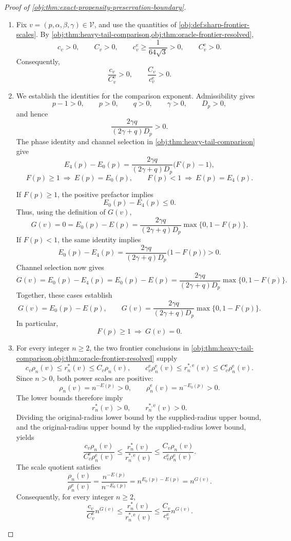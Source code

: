 \documentclass[11pt]{article}
\begin{document}
\begin{proof}[Proof of \cref{obj:thm:exact-propensity-preservation-boundary}]
\begin{enumerate}
\item Fix \(v=(p,\alpha,\beta,\gamma)\in\mathcal V\), and use the quantities of \cref{obj:def:sharp-frontier-scales}. By \cref{obj:thm:heavy-tail-comparison,obj:thm:oracle-frontier-resolved},
\[
c_v>0,\qquad C_v>0,\qquad
c^{\mathrm e}_v\ge\frac{1}{64\sqrt3}>0,\qquad
C^{\mathrm e}_v>0.
\]
Consequently,
\[
\frac{c_v}{C^{\mathrm e}_v}>0,
\qquad
\frac{C_v}{c^{\mathrm e}_v}>0.
\]

\item We establish the identities for the comparison exponent. Admissibility gives
\[
p-1>0,\qquad p>0,\qquad q>0,\qquad
\gamma>0,\qquad D_p>0,
\]
and hence
\[
\frac{2\gamma q}{(2\gamma+q)D_p}>0.
\]
The phase identity and channel selection in \cref{obj:thm:heavy-tail-comparison} give
\[
E_4(p)-E_0(p)
=
\frac{2\gamma q}{(2\gamma+q)D_p}\bigl(F(p)-1\bigr),
\]
\[
F(p)\ge1\ \Longrightarrow\ E(p)=E_0(p),
\qquad
F(p)<1\ \Longrightarrow\ E(p)=E_4(p).
\]

If \(F(p)\ge1\), the positive prefactor implies
\[
E_0(p)-E_4(p)\le0.
\]
Thus, using the definition of \(G(v)\),
\[
G(v)=0=E_0(p)-E(p)
=
\frac{2\gamma q}{(2\gamma+q)D_p}\max\{0,1-F(p)\}.
\]
If \(F(p)<1\), the same identity implies
\[
E_0(p)-E_4(p)
=
\frac{2\gamma q}{(2\gamma+q)D_p}\bigl(1-F(p)\bigr)>0.
\]
Channel selection now gives
\[
G(v)=E_0(p)-E_4(p)=E_0(p)-E(p)
=
\frac{2\gamma q}{(2\gamma+q)D_p}\max\{0,1-F(p)\}.
\]
Together, these cases establish
\[
G(v)=E_0(p)-E(p),
\qquad
G(v)=
\frac{2\gamma q}{(2\gamma+q)D_p}\max\{0,1-F(p)\}.
\]
In particular,
\[
F(p)\ge1\ \Longrightarrow\ G(v)=0.
\]

\item For every integer \(n\ge2\), the two frontier conclusions in
\cref{obj:thm:heavy-tail-comparison,obj:thm:oracle-frontier-resolved} supply
\[
c_v\rho_n(v)\le r_n^*(v)\le C_v\rho_n(v),
\qquad
c^{\mathrm e}_v\rho_n^{\mathrm e}(v)
\le r_n^{*,\mathrm e}(v)
\le C^{\mathrm e}_v\rho_n^{\mathrm e}(v).
\]
Since \(n>0\), both power scales are positive:
\[
\rho_n(v)=n^{-E(p)}>0,
\qquad
\rho_n^{\mathrm e}(v)=n^{-E_0(p)}>0.
\]
The lower bounds therefore imply
\[
r_n^*(v)>0,\qquad r_n^{*,\mathrm e}(v)>0.
\]
Dividing the original-radius lower bound by the supplied-radius upper bound, and the original-radius upper bound by the supplied-radius lower bound, yields
\[
\frac{c_v\rho_n(v)}
     {C^{\mathrm e}_v\rho_n^{\mathrm e}(v)}
\le
\frac{r_n^*(v)}{r_n^{*,\mathrm e}(v)}
\le
\frac{C_v\rho_n(v)}
     {c^{\mathrm e}_v\rho_n^{\mathrm e}(v)}.
\]
The scale quotient satisfies
\[
\frac{\rho_n(v)}{\rho_n^{\mathrm e}(v)}
=
\frac{n^{-E(p)}}{n^{-E_0(p)}}
=
n^{E_0(p)-E(p)}
=
n^{G(v)}.
\]
Consequently, for every integer \(n\ge2\),
\[
\frac{c_v}{C^{\mathrm e}_v}n^{G(v)}
\le
\frac{r_n^*(v)}{r_n^{*,\mathrm e}(v)}
\le
\frac{C_v}{c^{\mathrm e}_v}n^{G(v)}.
\]


\end{enumerate}
\end{proof}
\end{document}
